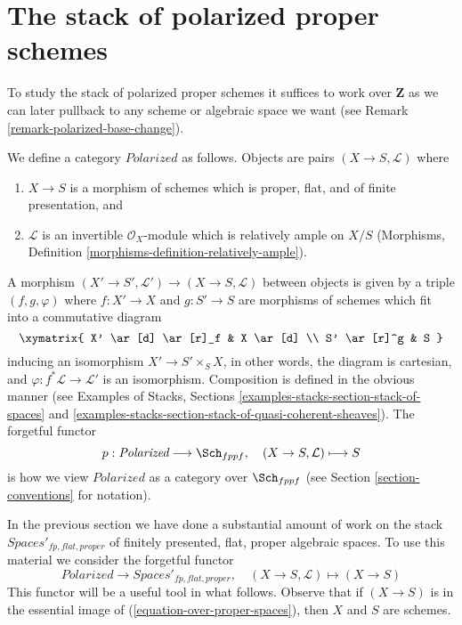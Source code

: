 \section{The stack of polarized proper schemes}
\label{section-polarized}

\noindent
To study the stack of polarized proper schemes it suffices to work
over $\mathbf{Z}$ as we can later pullback to any scheme or algebraic
space we want (see Remark \ref{remark-polarized-base-change}).

\begin{situation}
\label{situation-polarized}
We define a category $\textit{Polarized}$ as follows. Objects are
pairs $(X \to S, \mathcal{L})$ where
\begin{enumerate}
\item $X \to S$ is a morphism of schemes which is proper, flat, and
of finite presentation, and
\item $\mathcal{L}$ is an invertible $\mathcal{O}_X$-module
which is relatively ample on $X/S$
(Morphisms, Definition \ref{morphisms-definition-relatively-ample}).
\end{enumerate}
A morphism $(X' \to S', \mathcal{L}') \to (X \to S, \mathcal{L})$
between objects
is given by a triple $(f, g, \varphi)$ where $f : X' \to X$ and $g : S' \to S$
are morphisms of schemes which fit into a commutative diagram
$$
\xymatrix{
X' \ar[d] \ar[r]_f & X \ar[d] \\
S' \ar[r]^g & S
}
$$
inducing an isomorphism $X' \to S' \times_S X$, in other words, the
diagram is cartesian,
and $\varphi : f^*\mathcal{L} \to \mathcal{L}'$ is an isomorphism.
Composition is defined in the obvious manner (see
Examples of Stacks, Sections
\ref{examples-stacks-section-stack-of-spaces} and
\ref{examples-stacks-section-stack-of-quasi-coherent-sheaves}).
The forgetful functor
$$
p : \textit{Polarized} \longrightarrow \Sch_{fppf},\quad
(X \to S, \mathcal{L}) \longmapsto S
$$
is how we view $\textit{Polarized}$ as a category over $\Sch_{fppf}$
(see Section \ref{section-conventions} for notation).
\end{situation}

\noindent
In the previous section we have done a substantial amount of work on the stack
$\textit{Spaces}'_{fp, flat, proper}$
of finitely presented, flat, proper algebraic spaces. To use this material
we consider the forgetful functor
\begin{equation}
\label{equation-over-proper-spaces}
\textit{Polarized} \longrightarrow
\textit{Spaces}'_{fp, flat, proper},\quad
(X \to S, \mathcal{L}) \longmapsto (X \to S)
\end{equation}
This functor will be a useful tool in what follows.
Observe that if $(X \to S)$ is in the essential image
of (\ref{equation-over-proper-spaces}), then
$X$ and $S$ are schemes.

